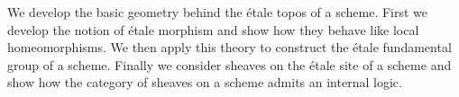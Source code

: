 We develop the basic geometry behind the \'etale topos of a scheme. First we develop the notion of \'etale morphism and show how they behave like local homeomorphisms. We then apply this theory to construct the \'etale fundamental group of a scheme. Finally we consider sheaves on the \'etale site of a scheme and show how the category of sheaves on a scheme admits an internal logic.
